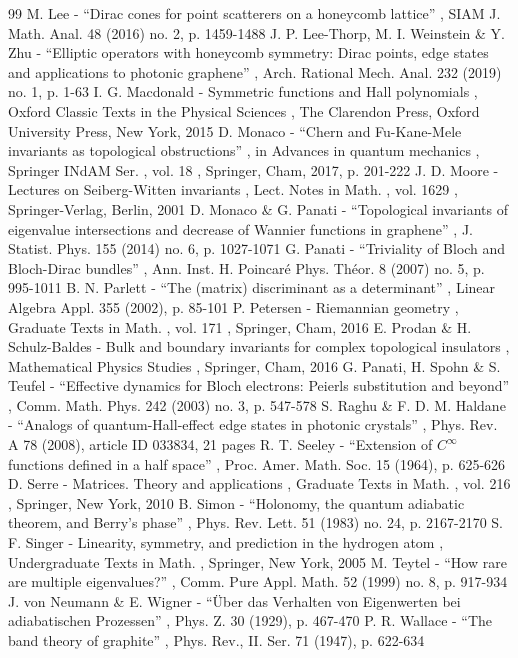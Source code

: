 \documentclass[10pt]{amsart}
\theoremstyle{definition}
\begin{document}
\begin{thebibliography}{99}
 M. Lee - “Dirac cones for point scatterers on a honeycomb lattice” , SIAM J. Math. Anal. 48 (2016) no. 2, p. 1459-1488
 J. P. Lee-Thorp, M. I. Weinstein \& Y. Zhu - “Elliptic operators with honeycomb symmetry: Dirac points, edge states and applications to photonic graphene” , Arch. Rational Mech. Anal. 232 (2019) no. 1, p. 1-63
 I. G. Macdonald - Symmetric functions and Hall polynomials , Oxford Classic Texts in the Physical Sciences , The Clarendon Press, Oxford University Press, New York, 2015
 D. Monaco - “Chern and Fu-Kane-Mele invariants as topological obstructions” , in Advances in quantum mechanics , Springer INdAM Ser. , vol. 18 , Springer, Cham, 2017, p. 201-222
 J. D. Moore - Lectures on Seiberg-Witten invariants , Lect. Notes in Math. , vol. 1629 , Springer-Verlag, Berlin, 2001
 D. Monaco \& G. Panati - “Topological invariants of eigenvalue intersections and decrease of Wannier functions in graphene” , J. Statist. Phys. 155 (2014) no. 6, p. 1027-1071
 G. Panati - “Triviality of Bloch and Bloch-Dirac bundles” , Ann. Inst. H. Poincaré Phys. Théor. 8 (2007) no. 5, p. 995-1011
 B. N. Parlett - “The (matrix) discriminant as a determinant” , Linear Algebra Appl. 355 (2002), p. 85-101
 P. Petersen - Riemannian geometry , Graduate Texts in Math. , vol. 171 , Springer, Cham, 2016
 E. Prodan \& H. Schulz-Baldes - Bulk and boundary invariants for complex topological insulators , Mathematical Physics Studies , Springer, Cham, 2016
 G. Panati, H. Spohn \& S. Teufel - “Effective dynamics for Bloch electrons: Peierls substitution and beyond” , Comm. Math. Phys. 242 (2003) no. 3, p. 547-578
 S. Raghu \& F. D. M. Haldane - “Analogs of quantum-Hall-effect edge states in photonic crystals” , Phys. Rev. A 78 (2008), article ID 033834, 21 pages
 R. T. Seeley - “Extension of $C^{\infty }$ functions defined in a half space” , Proc. Amer. Math. Soc. 15 (1964), p. 625-626
 D. Serre - Matrices. Theory and applications , Graduate Texts in Math. , vol. 216 , Springer, New York, 2010
 B. Simon - “Holonomy, the quantum adiabatic theorem, and Berry’s phase” , Phys. Rev. Lett. 51 (1983) no. 24, p. 2167-2170
 S. F. Singer - Linearity, symmetry, and prediction in the hydrogen atom , Undergraduate Texts in Math. , Springer, New York, 2005
 M. Teytel - “How rare are multiple eigenvalues?” , Comm. Pure Appl. Math. 52 (1999) no. 8, p. 917-934
 J. von Neumann \& E. Wigner - “Über das Verhalten von Eigenwerten bei adiabatischen Prozessen” , Phys. Z. 30 (1929), p. 467-470
 P. R. Wallace - “The band theory of graphite” , Phys. Rev., II. Ser. 71 (1947), p. 622-634
\end{thebibliography}
\end{document}
